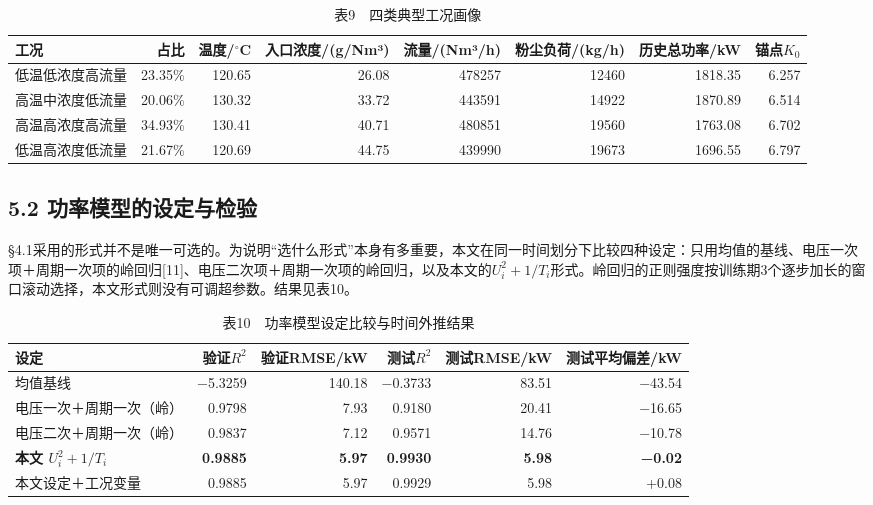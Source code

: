 \documentclass[UTF8,zihao=5,a4paper]{ctexart}
\begin{document}
\begin{table}[htbp]
\centering
\caption*{\normalsize 表9　四类典型工况画像}
\vspace{-2pt}
\begin{tabularx}{\textwidth}{>{\hsize=1.000\hsize\raggedright\arraybackslash}Xrrrrrrr}
\toprule
工况 & 占比 & 温度/$^\circ$C & 入口浓度/(g/Nm³) & 流量/(Nm³/h) & 粉尘负荷/(kg/h) & 历史总功率/kW & 锚点$K_0$ \\
\midrule
1 低温低浓度高流量 & 23.35\% & 120.65 & 26.08 & 478257 & 12460 & 1818.35 & 6.257 \\
2 高温中浓度低流量 & 20.06\% & 130.32 & 33.72 & 443591 & 14922 & 1870.89 & 6.514 \\
3 高温高浓度高流量 & 34.93\% & 130.41 & 40.71 & 480851 & 19560 & 1763.08 & 6.702 \\
4 低温高浓度低流量 & 21.67\% & 120.69 & 44.75 & 439990 & 19673 & 1696.55 & 6.797 \\
\bottomrule
\end{tabularx}
\end{table}

\subsection*{5.2 功率模型的设定与检验}

§4.1采用的形式并不是唯一可选的。为说明“选什么形式”本身有多重要，本文在同一时间划分下比较四种设定：只用均值的基线、电压一次项＋周期一次项的岭回归[11]、电压二次项＋周期一次项的岭回归，以及本文的$U_i^2+1/T_i$形式。岭回归的正则强度按训练期3个逐步加长的窗口滚动选择，本文形式则没有可调超参数。结果见表10。


\begin{table}[htbp]
\centering
\caption*{\normalsize 表10　功率模型设定比较与时间外推结果}
\vspace{-2pt}
\begin{tabularx}{\textwidth}{>{\hsize=1.000\hsize\raggedright\arraybackslash}Xrrrrr}
\toprule
设定 & 验证$R^2$ & 验证RMSE/kW & 测试$R^2$ & 测试RMSE/kW & 测试平均偏差/kW \\
\midrule
均值基线 & −5.3259 & 140.18 & −0.3733 & 83.51 & −43.54 \\
电压一次＋周期一次（岭） & 0.9798 & 7.93 & 0.9180 & 20.41 & −16.65 \\
电压二次＋周期一次（岭） & 0.9837 & 7.12 & 0.9571 & 14.76 & −10.78 \\
\textbf{本文 $U_i^2+1/T_i$} & \textbf{0.9885} & \textbf{5.97} & \textbf{0.9930} & \textbf{5.98} & \textbf{−0.02} \\
本文设定＋工况变量 & 0.9885 & 5.97 & 0.9929 & 5.98 & +0.08 \\
\bottomrule
\end{tabularx}
\end{table}
\end{document}
